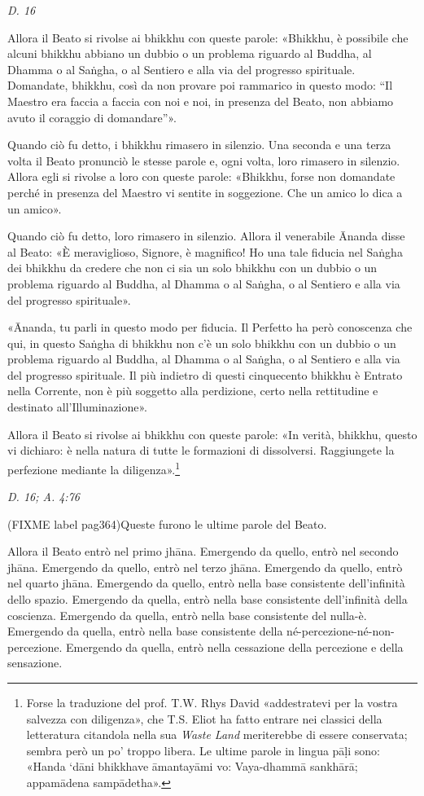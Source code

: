 \emph{D. 16}


Allora il Beato si rivolse ai bhikkhu con queste parole: «Bhikkhu, è
possibile che alcuni bhikkhu abbiano un dubbio o un problema riguardo al
Buddha, al Dhamma o al Saṅgha, o al Sentiero e alla via del progresso
spirituale. Domandate, bhikkhu, così da non provare poi rammarico in
questo modo: “Il Maestro era faccia a faccia con noi e noi, in presenza
del Beato, non abbiamo avuto il coraggio di domandare”».


Quando ciò fu detto, i bhikkhu rimasero in silenzio. Una seconda e una
terza volta il Beato pronunciò le stesse parole e, ogni volta, loro
rimasero in silenzio. Allora egli si rivolse a loro con queste parole:
«Bhikkhu, forse non domandate perché in presenza del Maestro vi sentite
in soggezione. Che un amico lo dica a un amico».


Quando ciò fu detto, loro rimasero in silenzio. Allora il venerabile
Ānanda disse al Beato: «È meraviglioso, Signore, è magnifico! Ho una
tale fiducia nel Saṅgha dei bhikkhu da credere che non ci sia un solo
bhikkhu con un dubbio o un problema riguardo al Buddha, al Dhamma o al
Saṅgha, o al Sentiero e alla via del progresso spirituale».


«Ānanda, tu parli in questo modo per fiducia. Il Perfetto ha però
conoscenza che qui, in questo Saṅgha di bhikkhu non c’è un solo bhikkhu
con un dubbio o un problema riguardo al Buddha, al Dhamma o al Saṅgha, o
al Sentiero e alla via del progresso spirituale. Il più indietro di
questi cinquecento bhikkhu è Entrato nella Corrente, non è più soggetto
alla perdizione, certo nella rettitudine e destinato all’Illuminazione».


Allora il Beato si rivolse ai bhikkhu con queste parole: «In verità,
bhikkhu, questo vi dichiaro: è nella natura di tutte le formazioni di
dissolversi. Raggiungete la perfezione mediante la
diligenza».\footnote{Forse la traduzione del prof. T.W. Rhys David «addestratevi per la vostra salvezza con diligenza», che T.S. Eliot ha fatto entrare nei classici della letteratura citandola nella sua \emph{Waste Land} meriterebbe di essere conservata; sembra però un po’ troppo libera. Le ultime parole in lingua pāḷi sono: «Handa ‘dāni bhikkhave āmantayāmi vo: Vaya-dhammā sankhārā; appamādena sampādetha».}


\emph{D. 16; A. 4:76}


(FIXME label pag364)Queste furono le ultime parole del Beato.


Allora il Beato entrò nel primo jhāna. Emergendo da quello, entrò nel
secondo jhāna. Emergendo da quello, entrò nel terzo jhāna. Emergendo da
quello, entrò nel quarto jhāna. Emergendo da quello, entrò nella base
consistente dell’infinità dello spazio. Emergendo da quella, entrò nella
base consistente dell’infinità della coscienza. Emergendo da quella,
entrò nella base consistente del nulla-è. Emergendo da quella, entrò
nella base consistente della né-percezione-né-non-percezione. Emergendo
da quella, entrò nella cessazione della percezione e della sensazione.


